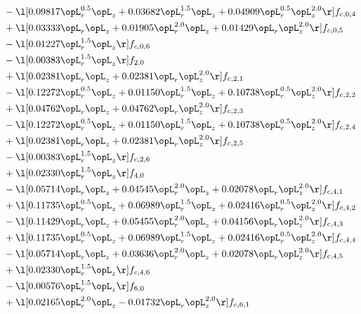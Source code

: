 \begin{alignat}{2}
& - \l[  0.09817 \opL_r^{0.5} \opL_z +  0.03682 \opL_r^{1.5} \opL_z +  0.04909 \opL_r^{0.5} \opL_z^{2.0}  \r] f_{c,0,4} \nonumber \\ 
& + \l[  0.03333 \opL_r \opL_z +  0.01905 \opL_r^{2.0} \opL_z +  0.01429 \opL_r \opL_z^{2.0}  \r] f_{c,0,5} \nonumber \\ 
& - \l[  0.01227 \opL_r^{1.5} \opL_z  \r] f_{c,0,6} \nonumber \\ 
& - \l[  0.00383 \opL_r^{1.5} \opL_z  \r] f_{2,0} \nonumber \\ 
& + \l[  0.02381 \opL_r \opL_z +  0.02381 \opL_r \opL_z^{2.0}  \r] f_{c,2,1} \nonumber \\ 
& - \l[  0.12272 \opL_r^{0.5} \opL_z +  0.01150 \opL_r^{1.5} \opL_z +  0.10738 \opL_r^{0.5} \opL_z^{2.0}  \r] f_{c,2,2} \nonumber \\ 
& + \l[  0.04762 \opL_r \opL_z +  0.04762 \opL_r \opL_z^{2.0}  \r] f_{c,2,3} \nonumber \\ 
& - \l[  0.12272 \opL_r^{0.5} \opL_z +  0.01150 \opL_r^{1.5} \opL_z +  0.10738 \opL_r^{0.5} \opL_z^{2.0}  \r] f_{c,2,4} \nonumber \\ 
& + \l[  0.02381 \opL_r \opL_z +  0.02381 \opL_r \opL_z^{2.0}  \r] f_{c,2,5} \nonumber \\ 
& - \l[  0.00383 \opL_r^{1.5} \opL_z  \r] f_{c,2,6} \nonumber \\ 
& + \l[  0.02330 \opL_r^{1.5} \opL_z  \r] f_{4,0} \nonumber \\ 
& - \l[  0.05714 \opL_r \opL_z +  0.04545 \opL_r^{2.0} \opL_z +  0.02078 \opL_r \opL_z^{2.0}  \r] f_{c,4,1} \nonumber \\ 
& + \l[  0.11735 \opL_r^{0.5} \opL_z +  0.06989 \opL_r^{1.5} \opL_z +  0.02416 \opL_r^{0.5} \opL_z^{2.0}  \r] f_{c,4,2} \nonumber \\ 
& - \l[  0.11429 \opL_r \opL_z +  0.05455 \opL_r^{2.0} \opL_z +  0.04156 \opL_r \opL_z^{2.0}  \r] f_{c,4,3} \nonumber \\ 
& + \l[  0.11735 \opL_r^{0.5} \opL_z +  0.06989 \opL_r^{1.5} \opL_z +  0.02416 \opL_r^{0.5} \opL_z^{2.0}  \r] f_{c,4,4} \nonumber \\ 
& - \l[  0.05714 \opL_r \opL_z +  0.03636 \opL_r^{2.0} \opL_z +  0.02078 \opL_r \opL_z^{2.0}  \r] f_{c,4,5} \nonumber \\ 
& + \l[  0.02330 \opL_r^{1.5} \opL_z  \r] f_{c,4,6} \nonumber \\ 
& - \l[  0.00576 \opL_r^{1.5} \opL_z  \r] f_{6,0} \nonumber \\ 
& + \l[  0.02165 \opL_r^{2.0} \opL_z   -0.01732 \opL_r \opL_z^{2.0}  \r] f_{c,6,1} \nonumber \\ 

\end{alignat}

